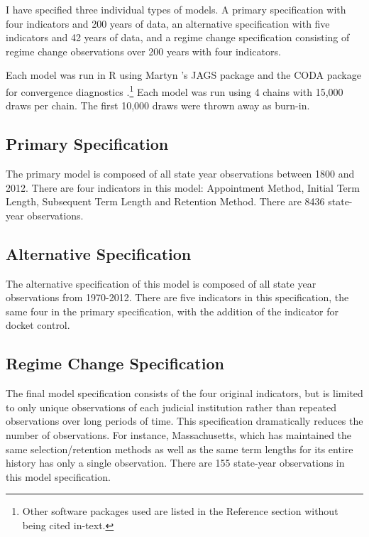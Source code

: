 \documentclass[JohnsonMADraft2]{subfiles}
\begin{document}
I have specified three individual types of models.  A primary specification with four indicators and 200 years of data, an alternative specification with five indicators and 42 years of data, and a regime change specification consisting of regime change observations over 200 years with four indicators.

Each model was run in R using Martyn \citeauthor{rjags}'s JAGS package and the CODA package for convergence diagnostics \cite{R,CODA}.\footnote{Other software packages used are listed in the Reference section without being cited in-text.}\nocite{R,CODA,R-Foreign,R2jags,ggplot2,dplyr,rjags}  Each model was run using 4 chains with 15,000 draws per chain.  The first 10,000 draws were thrown away as burn-in.

\subsection*{Primary Specification}
The primary model is composed of all state year observations between 1800 and 2012.  There are four indicators in this model: Appointment Method, Initial Term Length, Subsequent Term Length and Retention Method.  There are 8436 state-year observations.  

\subsection*{Alternative Specification}
The alternative specification of this model is composed of all state year observations from 1970-2012. There are five indicators in this specification, the same four in the primary specification, with the addition of the indicator for docket control.  

\subsection*{Regime Change Specification}
The final model specification consists of the four original indicators, but is limited to only unique observations of each judicial institution rather than repeated observations over long periods of time.  This specification dramatically reduces the number of observations.  For instance, Massachusetts, which has maintained the same selection/retention methods as well as the same term lengths for its entire history has only a single observation.  There are 155 state-year observations in this model specification.

%
%	
\end{document}
